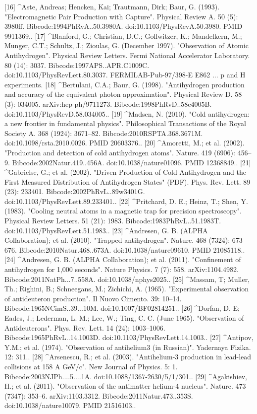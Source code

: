 [16]
^Aste, Andreas; Hencken, Kai; Trautmann, Dirk; Baur, G. (1993). "Electromagnetic Pair Production with Capture". Physical Review A. 50 (5): 3980ff. Bibcode:1994PhRvA..50.3980A. doi:10.1103/PhysRevA.50.3980. PMID 9911369..
[17]
^Blanford, G.; Christian, D.C.; Gollwitzer, K.; Mandelkern, M.; Munger, C.T.; Schultz, J.; Zioulas, G. (December 1997). "Observation of Atomic Antihydrogen". Physical Review Letters. Fermi National Accelerator Laboratory. 80 (14): 3037. Bibcode:1997APS..APR.C1009C. doi:10.1103/PhysRevLett.80.3037. FERMILAB-Pub-97/398-E E862 ... p and H experiments.
[18]
^Bertulani, C.A.; Baur, G. (1998). "Antihydrogen production and accuracy of the equivalent photon approximation". Physical Review D. 58 (3): 034005. arXiv:hep-ph/9711273. Bibcode:1998PhRvD..58c4005B. doi:10.1103/PhysRevD.58.034005..
[19]
^Madsen, N. (2010). "Cold antihydrogen: a new frontier in fundamental physics". Philosophical Transactions of the Royal Society A. 368 (1924): 3671–82. Bibcode:2010RSPTA.368.3671M. doi:10.1098/rsta.2010.0026. PMID 20603376..
[20]
^Amoretti, M.; et al. (2002). "Production and detection of cold antihydrogen atoms". Nature. 419 (6906): 456–9. Bibcode:2002Natur.419..456A. doi:10.1038/nature01096. PMID 12368849..
[21]
^Gabrielse, G.; et al. (2002). "Driven Production of Cold Antihydrogen and the First Measured Distribution of Antihydrogen States" (PDF). Phys. Rev. Lett. 89 (23): 233401. Bibcode:2002PhRvL..89w3401G. doi:10.1103/PhysRevLett.89.233401..
[22]
^Pritchard, D. E.; Heinz, T.; Shen, Y. (1983). "Cooling neutral atoms in a magnetic trap for precision spectroscopy". Physical Review Letters. 51 (21): 1983. Bibcode:1983PhRvL..51.1983T. doi:10.1103/PhysRevLett.51.1983..
[23]
^Andresen, G. B. (ALPHA Collaboration); et al. (2010). "Trapped antihydrogen". Nature. 468 (7324): 673–676. Bibcode:2010Natur.468..673A. doi:10.1038/nature09610. PMID 21085118..
[24]
^Andresen, G. B. (ALPHA Collaboration); et al. (2011). "Confinement of antihydrogen for 1,000 seconds". Nature Physics. 7 (7): 558. arXiv:1104.4982. Bibcode:2011NatPh...7..558A. doi:10.1038/nphys2025..
[25]
^Massam, T; Muller, Th.; Righini, B.; Schneegans, M.; Zichichi, A. (1965). "Experimental observation of antideuteron production". Il Nuovo Cimento. 39: 10–14. Bibcode:1965NCimS..39...10M. doi:10.1007/BF02814251..
[26]
^Dorfan, D. E; Eades, J.; Lederman, L. M.; Lee, W.; Ting, C. C. (June 1965). "Observation of Antideuterons". Phys. Rev. Lett. 14 (24): 1003–1006. Bibcode:1965PhRvL..14.1003D. doi:10.1103/PhysRevLett.14.1003..
[27]
^Antipov, Y.M.; et al. (1974). "Observation of antihelium3 (in Russian)". Yadernaya Fizika. 12: 311..
[28]
^Arsenescu, R.; et al. (2003). "Antihelium-3 production in lead-lead collisions at 158 A GeV/c". New Journal of Physics. 5: 1. Bibcode:2003NJPh....5....1A. doi:10.1088/1367-2630/5/1/301..
[29]
^Agakishiev, H.; et al. (2011). "Observation of the antimatter helium-4 nucleus". Nature. 473 (7347): 353–6. arXiv:1103.3312. Bibcode:2011Natur.473..353S. doi:10.1038/nature10079. PMID 21516103..